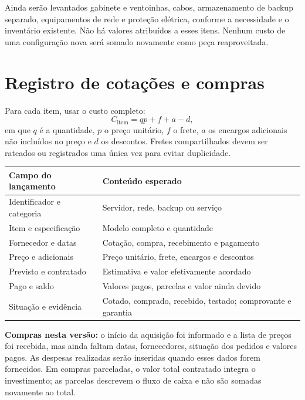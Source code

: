 \documentclass[11pt,a4paper,oneside]{report}
\begin{document}
Ainda serão levantados gabinete e ventoinhas, cabos, armazenamento de backup
separado, equipamentos de rede e proteção elétrica, conforme a necessidade e
o inventário existente. Não há valores atribuídos a esses itens. Nenhum custo
de uma configuração nova será somado novamente como peça reaproveitada.

\section{Registro de cotações e compras}
Para cada item, usar o custo completo:
\begin{equation}
C_{\mathrm{item}} = q p + f + a - d,
\end{equation}
em que $q$ é a quantidade, $p$ o preço unitário, $f$ o frete, $a$ os encargos
adicionais não incluídos no preço e $d$ os descontos. Fretes compartilhados
devem ser rateados ou registrados uma única vez para evitar duplicidade.

\begin{tabularx}{\textwidth}{@{}p{3.7cm}Y@{}}
\toprule
Campo do lançamento & Conteúdo esperado \\
\midrule
Identificador e categoria & Servidor, rede, backup ou serviço \\
Item e especificação & Modelo completo e quantidade \\
Fornecedor e datas & Cotação, compra, recebimento e pagamento \\
Preço e adicionais & Preço unitário, frete, encargos e descontos \\
Previsto e contratado & Estimativa e valor efetivamente acordado \\
Pago e saldo & Valores pagos, parcelas e valor ainda devido \\
Situação e evidência & Cotado, comprado, recebido, testado; comprovante e garantia \\
\bottomrule
\end{tabularx}

\textbf{Compras nesta versão:} o início da aquisição foi informado e a lista
de preços foi recebida, mas ainda faltam datas, fornecedores, situação dos
pedidos e valores pagos. As despesas realizadas serão inseridas quando esses
dados forem fornecidos. Em compras parceladas, o valor total contratado
integra o investimento; as parcelas descrevem o fluxo de caixa e não são somadas
novamente ao total.
\end{document}
